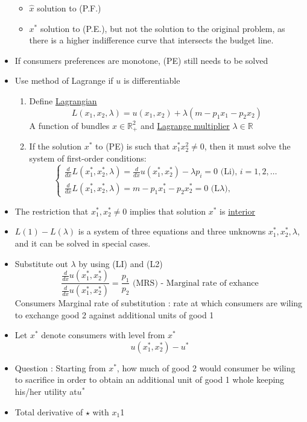 \documentclass[twoside]{article}
\begin{document}
\begin{itemize}
\begin{itemize}
\item \(\hat{x}\) solution to (P.F.)
\item \(x^*\) solution to (P.E.), but not the solution to the original problem, as there is a higher indifference curve that intersects the budget line. 
\end{itemize}
\item If consumers preferences are monotone, (PE) still needs to be solved
\item Use method of Lagrange if \(u\) is differentiable 
\begin{enumerate}
\item Define \underline{Lagrangian}
\[L(x_1, x_2, \lambda) = u(x_1, x_2) + \lambda (m - p_1x_1 - p_2x_2)\]
A function of bundles \(x \in \mathbb{R}^2_+\) and \underline{Lagrange multiplier} \(\lambda \in \mathbb{R}
\)
\item If the solution \(x^*\) to (PE) is such that \(x_1^* x_2^2 \neq 0 \), then it must solve the system of first-order conditions: 
\[\begin{cases}
\frac{d}{dx} L(x_1^* , x_2^*, \lambda) = \frac{d}{dx}  u(x_1^*, x_2^*) - \lambda p_i = 0   \text{ (Li), } i = 1, 2, \ldots \\
\frac{d}{dx} L(x_1^* , x_2^*, \lambda ) = m - p_1 x_1^* - p_2x_2^* = 0 \text { (L} \lambda \text{), }
\end{cases}\]
\end{enumerate}
\item The restriction that \(x_1^*, x_2^* \neq 0\) implies that solution \(x^*\) is \underline{interior} 
\item \(L(1) - L(\lambda)\) is a system of three equations and three unknowns \(x_1^*, x_2^*, \lambda\), and it can be solved in special cases.  
\item Substitute out \(\lambda\) by using (LI) and (L2) 
\[\frac{\frac{d}{dx} u(x_1^*, x_2^*)}{\frac{d}{dx} u(x_1^*, x_2^*) } = \frac{p_1}{p_2} \text{ (MRS) - Marginal rate of exhance}\]
Consumers Marginal rate of substitution : rate at which consumers are wiling to exchange good 2 against  additional units of  good 1  
\item Let \(x^*\) denote consumers with level from \(x^*\) 
\[u(x_1^*, x_2^*) - u^*\]
\item Question : Starting from \(x^*\), how much of good 2 would consumer be wiling to sacrifice in order to obtain an additional unit of good 1 whole keeping his/her utility at\(u^*\) 
\item Total derivative of \(\star\) with \(x_1\)1

\end{itemize}
\end{document}

